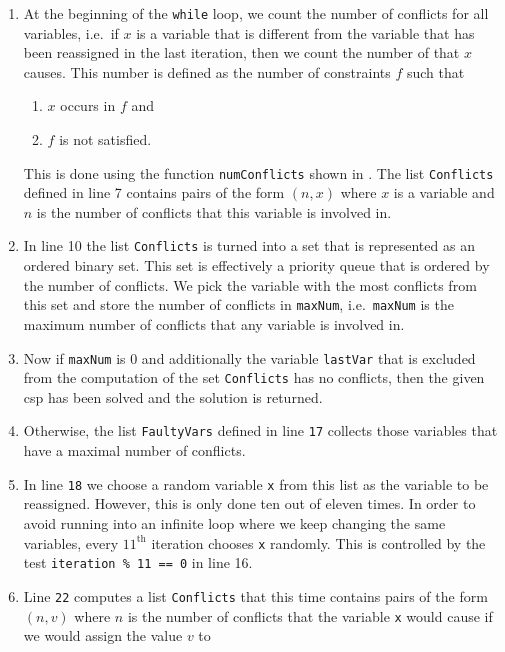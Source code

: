 \begin{enumerate}
\item At the beginning of the \texttt{while} loop, we count the number of conflicts for all variables, i.e.~if
      $x$ is a variable that is different from the variable that has been reassigned in the last iteration,
      then we count the number of   that $x$ causes.  This number is defined 
      as the number of constraints $f$ such that
      \begin{enumerate}
      \item $x$ occurs in $f$ and
      \item $f$ is not satisfied.
      \end{enumerate}
      This is done using the function \texttt{numConflicts} shown in .
      The list \texttt{Conflicts} defined in line 7 contains pairs of the form $(n, x)$ where $x$ is a
      variable and $n$ is the number of conflicts that this variable is involved in.
\item In line 10 the list \texttt{Conflicts} is turned into a set that is represented as an ordered binary set.
      This set is effectively a 
      priority queue that is ordered by the number of conflicts.  We pick the variable with the most conflicts
      from this set and store the number of conflicts in \texttt{maxNum}, i.e.~\texttt{maxNum} is the maximum
      number of conflicts that any variable is involved in.
\item Now if \texttt{maxNum} is $0$ and additionally the variable \texttt{lastVar} that is excluded from the
      computation of the set \texttt{Conflicts} has no conflicts, then the given \ac{csp} has been solved and
      the solution is returned.
\item Otherwise, the list  \texttt{FaultyVars} defined in line \texttt{17} collects those variables that have a maximal
      number of conflicts.  
\item In line \texttt{18} we choose a random variable \texttt{x} from this list as the variable to be
      reassigned.  However, this is only done ten out of eleven times.  In order to avoid running into an
      infinite loop where we keep changing the same variables, every $11^\textrm{th}$ iteration chooses
      \texttt{x} randomly.  This is controlled by the  test \texttt{iteration \% 11 == 0} in line 16.
\item Line \texttt{22} computes a list \texttt{Conflicts} that this time contains pairs of the form $(n, v)$ where $n$ 
      is the number of conflicts that the variable \texttt{x} would cause if we would assign the value $v$ to

\end{enumerate}
